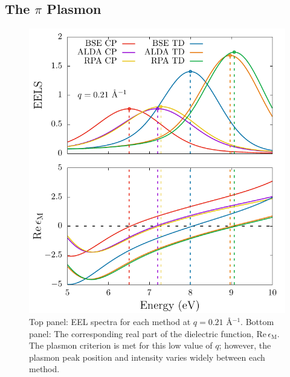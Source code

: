 \documentclass[aps,prb,10pt,showpacs,superscriptaddress,twocolumn,notitlepage]{revtex4-1}
\begin{document}

\subsection{The \texorpdfstring{$\pi$}{pi} Plasmon}

\begin{figure}[t]
\includegraphics[width=\linewidth]{fig02}
\caption{Top panel: EEL spectra for each method at $q = 0.21$
\r{A}$^{-1}$. Bottom panel: The corresponding real part of the dielectric
function, $\mathrm{Re}\,\epsilon_{\mathrm{M}}$. The plasmon criterion is met for
this low value of $q$; however, the plasmon peak position and intensity varies
widely between each method.}
\label{fig:comparison}
\end{figure}
\end{document}
